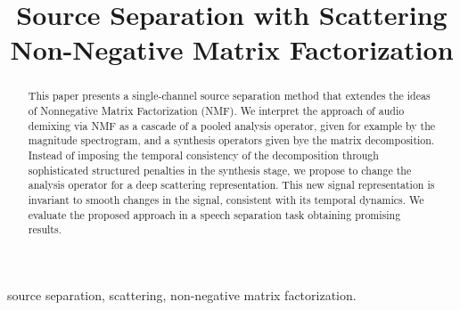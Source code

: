 \documentclass{article}
\title{Source Separation with Scattering Non-Negative Matrix Factorization}
\begin{document}
%
\maketitle
%
\begin{abstract}
This paper presents a single-channel source separation method
that extendes the ideas of Nonnegative Matrix Factorization (NMF).
We interpret the approach of audio demixing via NMF as a cascade of a pooled analysis operator, given
for example by the magnitude spectrogram, and a synthesis operators given bye the matrix decomposition.
Instead of imposing the temporal consistency of the decomposition through
sophisticated structured penalties in the synthesis stage,
we propose to change the analysis operator for a deep scattering representation. This new signal representation is
invariant to smooth changes in the signal, consistent with its temporal dynamics.
We evaluate the proposed approach in a speech separation task obtaining promising results.
\end{abstract}
%
\begin{keywords}
source separation, scattering, non-negative matrix factorization.
\end{keywords}
%










\selectfont 
\end{document}
